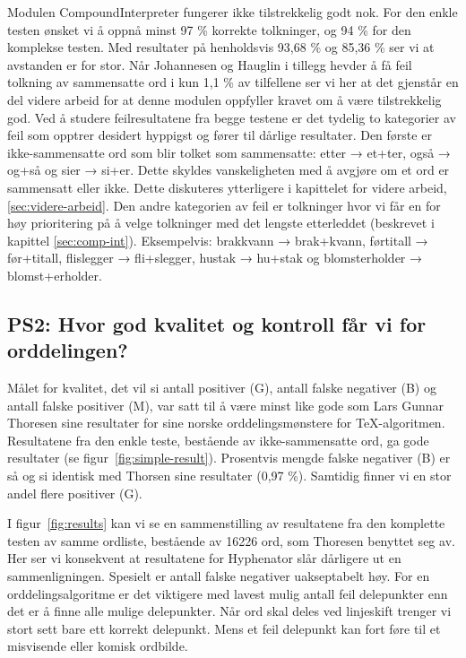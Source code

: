 Modulen CompoundInterpreter fungerer ikke tilstrekkelig godt nok. For den enkle testen ønsket vi å oppnå minst 97 \% korrekte tolkninger, og 94 \% for den komplekse testen. Med resultater på henholdsvis 93,68 \% og 85,36 \% ser vi at avstanden er for stor. Når Johannesen og Hauglin i tillegg hevder å få feil tolkning av sammensatte ord i kun 1,1 \% av tilfellene ser vi her at det gjenstår en del videre arbeid for at denne modulen oppfyller kravet om å være tilstrekkelig god. Ved å studere feilresultatene fra begge testene er det tydelig to kategorier av feil som opptrer desidert hyppigst og fører til dårlige resultater. Den første er ikke-sammensatte ord som blir tolket som sammensatte: etter → et+ter, også → og+så og sier → si+er. Dette skyldes vanskeligheten med å avgjøre om et ord er sammensatt eller ikke. Dette diskuteres ytterligere i kapittelet for videre arbeid, \ref{sec:videre-arbeid}. Den andre kategorien av feil er tolkninger hvor vi får en for høy prioritering på å velge tolkninger med det lengste etterleddet (beskrevet i kapittel \ref{sec:comp-int}). Eksempelvis: brakkvann → brak+kvann, førtitall → før+titall, flislegger → fli+slegger, hustak → hu+stak og blomsterholder → blomst+erholder. 

\subsection{PS2: Hvor god kvalitet og kontroll får vi for orddelingen?}


Målet for kvalitet, det vil si antall positiver (G), antall falske negativer (B) og antall falske positiver (M), var satt til å være minst like gode som Lars Gunnar Thoresen sine resultater for sine norske orddelingsmønstere for \TeX{}-algoritmen. Resultatene fra den enkle teste, bestående av ikke-sammensatte ord, ga gode resultater (se figur~\ref{fig:simple-result}). Prosentvis mengde falske negativer (B) er så og si identisk med Thorsen sine resultater (0,97 \%). Samtidig finner vi en stor andel flere positiver (G). 

I figur~\ref{fig:results} kan vi se en sammenstilling av resultatene fra den komplette testen av samme ordliste, bestående av 16226 ord, som Thoresen benyttet seg av. Her ser vi konsekvent at resultatene for Hyphenator slår dårligere ut en sammenligningen. Spesielt er antall falske negativer uakseptabelt høy. For en orddelingsalgoritme er det viktigere med lavest mulig antall feil delepunkter enn det er å finne alle mulige delepunkter. Når ord skal deles ved linjeskift trenger vi stort sett bare ett korrekt delepunkt. Mens et feil delepunkt kan fort føre til et misvisende eller komisk ordbilde.

